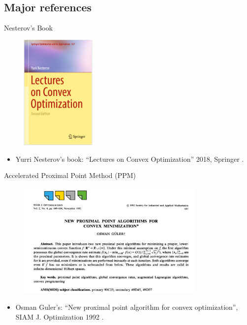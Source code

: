 \documentclass[11pt]{beamer}
\begin{document}
    \subsection{Major references}
        \begin{frame}{Nesterov's Book}
            \begin{figure}
                \centering
                \includegraphics[width=10em]{assets/Nesterov Book.png}    
            \end{figure}
            \begin{itemize}
                \item Yurri Nesterov's book: ``Lectures on Convex Optimization'' 2018, Springer \cite{nesterov_lectures_2018}. 
            \end{itemize}
        \end{frame}
        \begin{frame}{Accelerated Proximal Point Method (PPM)}
            \begin{figure}
                \centering
                \includegraphics[width=25em]{assets/Acc ppm}
            \end{figure}
            \begin{itemize}
                \item Osman Guler's: ``New proximal point algorithm for convex optimization'', SIAM J. Optimization 1992 \cite{guler_new_1992}. 
            \end{itemize}
        \end{frame}
\end{document}
